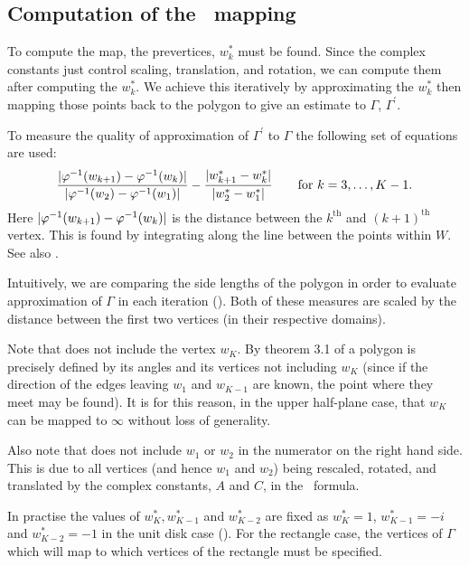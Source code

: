 \subsection{Computation of the \sch\ mapping}
\label{sc-mapping-problem}

To compute the map, the prevertices, $w^*_k$ must be found. Since the complex constants just control scaling, translation, and rotation, we can compute them after computing the $w^*_k$. We achieve this iteratively by approximating the $w^*_k$ then mapping those points back to the polygon to give an estimate to $\Gamma$, $\Gamma^\prime$. 

To measure the quality of approximation of $\Gamma^\prime$ to $\Gamma$ the following set of equations are used:
\begin{equation}
\label{optimizeme}
\frac{\vert \varphi^{-1}(w_{k+1}) -  \varphi^{-1}(w_k) \vert}{\vert \varphi^{-1}(w_2)-\varphi^{-1}(w_1)\vert} - \frac{\vert w^*_{k+1} - w^*_k\vert}{\vert w^*_2 - w^*_1\vert} \qquad \text{for } k=3,\dots,K-1.
\end{equation}
Here $\vert \varphi^{-1}(w_{k+1}) -  \varphi^{-1}(w_k) \vert$ is the distance between the $k^{\text{th}}$ and $(k+1)^{\text{th}}$ vertex. This is found by integrating along the line between the points within $W$. See also .

Intuitively, we are comparing the side lengths of the polygon in order to evaluate approximation of $\Gamma$ in each iteration (\cite[A-3]{snider}). Both of these measures are scaled by the distance between the first two vertices (in their respective domains).

Note that  does not include the vertex $w_K$. By theorem 3.1 of \cite[p. 24]{driscoll} a polygon is precisely defined by its angles and its vertices not including $w_K$ (since if the direction of the edges leaving $w_1$ and $w_{K-1}$ are known, the point where they meet may be found). It is for this reason, in the upper half-plane case, that $w_K$ can be mapped to $\infty$ without loss of generality.

Also note that  does not include $w_1$ or $w_2$ in the numerator on the right hand side. This is due to all vertices (and hence $w_1$ and $w_2$) being rescaled, rotated, and translated by the complex constants, $A$ and $C$, in the \sch\ formula.

In practise the values of $w^*_K, w^*_{K-1}$ and $w^*_{K-2}$ are fixed as $w^*_K=1$, $w^*_{K-1}=-i$ and $w^*_{K-2}=-1$ in the unit disk case (\cite[p. 24]{driscoll}). For the rectangle case, the vertices of $\Gamma$ which will map to which vertices of the rectangle must be specified.

